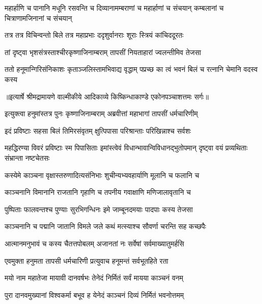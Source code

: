 \threelineshloka
{महार्हाणि च पानानि मधूनि रसवन्ति च}
{दिव्यानामम्बराणां च महार्हाणां च संचयान्}
{कम्बलानां च चित्राणामजिनानां च संचयान्} %

\twolineshloka
{तत्र तत्र विचिन्वन्तो बिले तत्र महाप्रभाः}
{ददृशुर्वानराः शूराः स्त्रियं कांचिददूरतः} %

\twolineshloka
{तां दृष्ट्वा भृशसंत्रस्ताश्चीरकृष्णाजिनाम्बराम्}
{तापसीं नियताहारां ज्वलन्तीमिव तेजसा} %

\fourlineindentedshloka
{ततो हनूमान्गिरिसंनिकाशः}
{ कृताञ्जलिस्तामभिवाद्य वृद्धाम्}
{पप्रच्छ का त्वं भवनं बिलं च}
{ रत्नानि चेमानि वदस्व कस्य} %


{॥इत्यार्षे श्रीमद्रामायणे वाल्मीकीये आदिकाव्ये किष्किन्धाकाण्डे एकोनपञ्चाशत्तमः सर्गः॥}


\twolineshloka
{इत्युक्त्वा हनुमांस्तत्र पुनः कृष्णाजिनाम्बराम्}
{अब्रवीत्तां महाभागां तापसीं धर्मचारिणीम्} %

\twolineshloka
{इदं प्रविष्टाः सहसा बिलं तिमिरसंवृतम्}
{क्षुत्पिपासा परिश्रान्ताः परिखिन्नाश्च सर्वशः} %

\threelineshloka
{महद्धिरण्या विवरं प्रविष्टाः स्म पिपासिताः}
{इमांस्त्वेवं विधान्भावान्विविधानद्भुतोपमान्}
{दृष्ट्वा वयं प्रव्यथिताः संभ्रान्ता नष्टचेतसः} %

\twolineshloka
{कस्येमे काञ्चना वृक्षास्तरुणादित्यसंनिभाः}
{शुचीन्यभ्यवहार्याणि मूलानि च फलानि च} %

\twolineshloka
{काञ्चनानि विमानानि राजतानि गृहाणि च}
{तपनीय गवाक्षाणि मणिजालावृतानि च} %

\twolineshloka
{पुष्पिताः फालवन्तश्च पुण्याः सुरभिगन्धिनः}
{इमे जाम्बूनदमयाः पादपाः कस्य तेजसा} %

\twolineshloka
{काञ्चनानि च पद्मानि जातानि विमले जले}
{कथं मत्स्याश्च सौवर्णा चरन्ति सह कच्छपैः} %

\twolineshloka
{आत्मानमनुभावं च कस्य चैतत्तपोबलम्}
{अजानतां नः सर्वेषां सर्वमाख्यातुमर्हसि} %

\twolineshloka
{एवमुक्ता हनुमता तापसी धर्मचारिणी}
{प्रत्युवाच हनूमन्तं सर्वभूतहिते रता} %

\twolineshloka
{मयो नाम महातेजा मायावी दानवर्षभः}
{तेनेदं निर्मितं सर्वं मायया काञ्चनं वनम्} %

\twolineshloka
{पुरा दानवमुख्यानां विश्वकर्मा बभूव ह}
{येनेदं काञ्चनं दिव्यं निर्मितं भवनोत्तमम्} %

